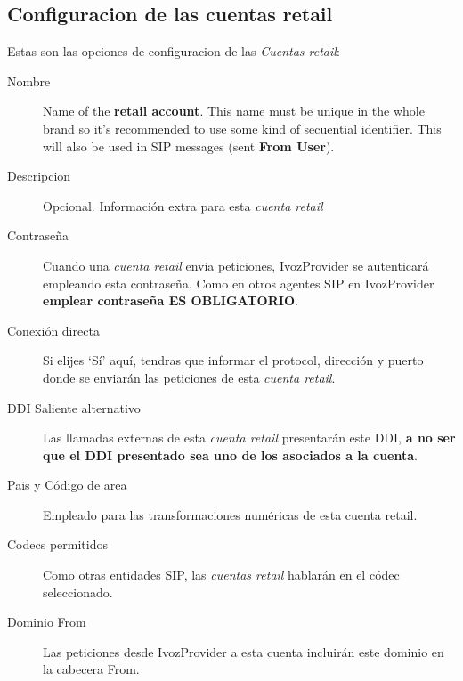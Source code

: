 \documentclass[letterpaper,10pt,spanish]{sphinxmanual}
\begin{document}
\subsection{Configuracion de las cuentas retail}
\label{retail/retail_accounts:retail-accounts-configuration}
Estas son las opciones de configuracion de las \emph{Cuentas retail}:
\begin{description}
\item[{Nombre}] \leavevmode{}\label{retail/retail_accounts:term-name}
Name of the \textbf{retail account}. This name must be unique in the whole brand so
it's recommended to use some kind of secuential identifier. This will also be used
in SIP messages (sent \textbf{From User}).

\item[{Descripcion}] \leavevmode{}\label{retail/retail_accounts:term-description}
Opcional. Información extra para esta \emph{cuenta retail}

\item[{Contraseña}] \leavevmode{}\label{retail/retail_accounts:term-password}
Cuando una \emph{cuenta retail} envia peticiones, IvozProvider se autenticará empleando esta contraseña. Como en otros agentes SIP en IvozProvider \textbf{emplear contraseña ES OBLIGATORIO}.

\item[{Conexión directa}] \leavevmode{}\label{retail/retail_accounts:term-direct-connection}
Si elijes `Sí' aquí, tendras que informar el protocol, dirección y puerto donde se enviarán las peticiones de esta \emph{cuenta retail}.

\item[{DDI Saliente alternativo}] \leavevmode{}\label{retail/retail_accounts:term-fallback-outgoing-ddi}
Las llamadas externas de esta \emph{cuenta retail} presentarán este DDI, \textbf{a no ser que el DDI presentado sea uno de los asociados a la cuenta}.

\item[{Pais y Código de area}] \leavevmode{}\label{retail/retail_accounts:term-country-and-area-code}
Empleado para las transformaciones numéricas de esta cuenta retail.

\item[{Codecs permitidos}] \leavevmode{}\label{retail/retail_accounts:term-allowed-codecs}
Como otras entidades SIP, las \emph{cuentas retail} hablarán en el códec seleccionado.

\item[{Dominio From}] \leavevmode{}\label{retail/retail_accounts:term-from-domain}
Las peticiones desde IvozProvider a esta cuenta incluirán este dominio en la cabecera From.

\end{description}
\end{document}
